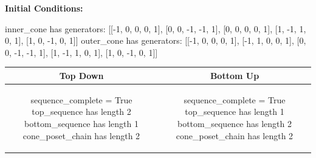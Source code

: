 \documentclass[10pt]{article}
\begin{document}
\textbf{Initial Conditions:}
\begin{SAGE}
inner_cone has generators: 
[[-1, 0, 0, 0, 1], [0, 0, -1, -1, 1], [0, 0, 0, 0, 1], [1, -1, 1, 0, 1], [1, 0, -1, 0, 1]]
outer_cone has generators: 
[[-1, 0, 0, 0, 1], [-1, 1, 0, 0, 1], [0, 0, -1, -1, 1], [1, -1, 1, 0, 1], [1, 0, -1, 0, 1]]

\end{SAGE}
\begin{tabular}{c|c}
\textbf{Top Down} & \textbf{Bottom Up} \\ \hline  
\begin{SAGE}
sequence_complete = True
top_sequence has length 2
bottom_sequence has length 1
cone_poset_chain has length 2
\end{SAGE} 
&
\begin{SAGE}
sequence_complete = True
top_sequence has length 1
bottom_sequence has length 2
cone_poset_chain has length 2
\end{SAGE} 
\\ \hline


\end{tabular}
\end{document}
